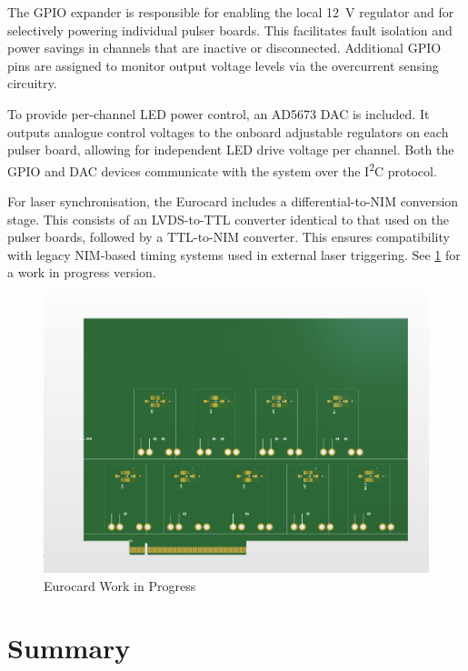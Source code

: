 \documentclass[a4paper,11pt]{article}
\begin{document}
The GPIO expander is responsible for enabling the local \SI{12}{\volt} regulator and for selectively powering individual pulser boards. This facilitates fault isolation and power savings in channels that are inactive or disconnected. Additional GPIO pins are assigned to monitor output voltage levels via the overcurrent sensing circuitry.

To provide per-channel LED power control, an AD5673 \cite{AD5673} DAC is included. It outputs analogue control voltages to the onboard adjustable regulators on each pulser board, allowing for independent LED drive voltage per channel. Both the GPIO and DAC devices communicate with the system over the I\textsuperscript{2}C protocol.

For laser synchronisation, the Eurocard includes a differential-to-NIM conversion stage. This consists of an LVDS-to-TTL converter identical to that used on the pulser boards, followed by a TTL-to-NIM converter. This ensures compatibility with legacy NIM-based timing systems used in external laser triggering. See \cref{fig:EurocardWIP} for a work in progress version.

\begin{figure}[htbp]
\centering
\includegraphics[scale=0.5]{EurocardWIP.png}
\caption{Eurocard Work in Progress\label{fig:EurocardWIP}}
\end{figure}



\section{Summary}
\end{document}

